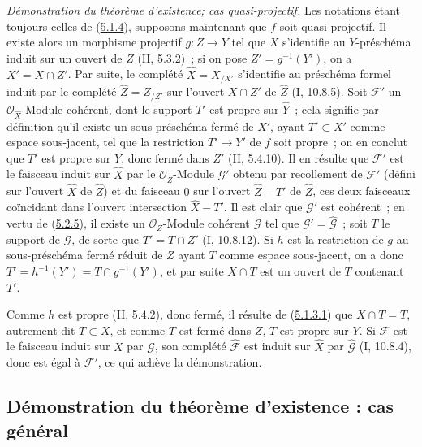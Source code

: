\begin{env}[5.2.6]
\label{III.5.2.6-fr}
\emph{Démonstration du théorème d'existence; cas quasi-projectif.}
Les notations étant toujours celles de (\hyperref[III.5.1.4-fr]{5.1.4}), supposons
maintenant que $f$ soit quasi-projectif. Il existe alors un morphisme projectif
$g:Z\to Y$ tel que $X$ s'identifie au $Y$-préschéma induit sur un ouvert de $Z$
(II, 5.3.2)~; si on pose $Z'=g^{-1}(Y')$, on a $X'=X\cap Z'$. Par suite, le
complété $\widehat X=X_{/X'}$ s'identifie au préschéma formel induit par le complété
$\widehat Z=Z_{/Z'}$ sur l'ouvert $X\cap Z'$ de $\widehat Z$ (I, 10.8.5). Soit
$\mathcal F'$ un $\mathcal O_{\widehat X}$-Module cohérent, dont le support $T'$ est
propre sur $\widehat Y$~; cela signifie par définition qu'il existe un sous-préschéma
fermé de $X'$, ayant $T'\subset X'$ comme espace sous-jacent, tel que la restriction
$T'\to Y'$ de $f$ soit propre~; on en conclut que $T'$ est propre sur $Y$, donc
fermé dans $Z'$ (II, 5.4.10). Il en résulte que $\mathcal F'$ est le faisceau induit
sur $\widehat X$ par le $\mathcal O_{\widehat Z}$-Module $\mathcal G'$ obtenu par
recollement de $\mathcal F'$ (défini sur l'ouvert $\widehat X$ de $\widehat Z$) et
du faisceau $0$ sur l'ouvert $\widehat Z-T'$ de $\widehat Z$, ces deux faisceaux
coïncidant dans l'ouvert intersection $\widehat X-T'$. Il est clair que
$\mathcal G'$ est cohérent~; en vertu de
(\hyperref[III.5.2.5-fr]{5.2.5}), il existe un $\mathcal O_Z$-Module cohérent
$\mathcal G$ tel que $\mathcal G'=\widehat{\mathcal G}$~; soit $T$ le support de
$\mathcal G$, de sorte que $T'=T\cap Z'$ (I, 10.8.12). Si $h$ est la restriction
de $g$ au sous-préschéma fermé réduit de $Z$ ayant $T$ comme espace sous-jacent, on
a donc $T'=h^{-1}(Y')=T\cap g^{-1}(Y')$, et par suite $X\cap T$ est un ouvert de
$T$ contenant $T'$.


Comme $h$ est propre (II, 5.4.2), donc fermé, il résulte de
(\hyperref[III.5.1.3.1-fr]{5.1.3.1}) que $X\cap T=T$, autrement dit $T\subset X$,
et comme $T$ est fermé dans $Z$, $T$ est propre sur $Y$. Si $\mathcal F$ est le
faisceau induit sur $X$ par $\mathcal G$, son complété $\widehat{\mathcal F}$ est
induit sur $\widehat X$ par $\widehat{\mathcal G}$ (I, 10.8.4), donc est égal à
$\mathcal F'$, ce qui achève la démonstration.
\end{env}

\subsection{Démonstration du théorème d'existence : cas général}
\label{subsection:III.5.3-fr}

